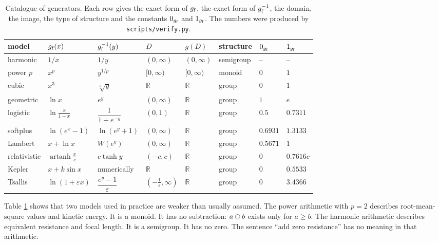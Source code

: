 \documentclass[11pt,a4paper]{article}
\begin{document}
\begin{table}[t]
\centering
\small
\caption{Catalogue of generators. Each row gives the exact form of $g_{\mathrm{f}}$, the
exact form of $g_{\mathrm{f}}^{-1}$, the domain, the image, the type of structure and the
constants $0_{g_{\mathrm{f}}}$ and $1_{g_{\mathrm{f}}}$. The numbers were produced by
\texttt{scripts/verify.py}.}
\label{tab:catalogue}
\setlength{\tabcolsep}{4pt}
\begin{tabularx}{\textwidth}{@{}l l l l l l l l@{}}
\toprule
\textbf{model} & $g_{\mathrm{f}}(x)$ & $g_{\mathrm{f}}^{-1}(y)$ & $D$ & $g(D)$ & \textbf{structure}
& $0_{g_{\mathrm{f}}}$ & $1_{g_{\mathrm{f}}}$ \\
\midrule
harmonic & $1/x$ & $1/y$ & $(0,\infty)$ & $(0,\infty)$ & semigroup & -- & -- \\
power $p$ & $x^{p}$ & $y^{1/p}$ & $[0,\infty)$ & $[0,\infty)$ & monoid & $0$ & $1$ \\
cubic & $x^{3}$ & $\sqrt[3]{y}$ & $\mathbb{R}$ & $\mathbb{R}$ & group & $0$ & $1$ \\
geometric & $\ln x$ & $e^{y}$ & $(0,\infty)$ & $\mathbb{R}$ & group & $1$ & $e$ \\
logistic & $\ln\frac{x}{1-x}$ & $\dfrac{1}{1+e^{-y}}$ & $(0,1)$ & $\mathbb{R}$ & group & $0.5$ & $0.7311$ \\
softplus & $\ln(e^{x}-1)$ & $\ln(e^{y}+1)$ & $(0,\infty)$ & $\mathbb{R}$ & group & $0.6931$ & $1.3133$ \\
Lambert & $x+\ln x$ & $W(e^{y})$ & $(0,\infty)$ & $\mathbb{R}$ & group & $0.5671$ & $1$ \\
relativistic & $\operatorname{artanh}\frac{x}{c}$ & $c\tanh y$
& $(-c,c)$ & $\mathbb{R}$ & group & $0$ & $0.7616c$ \\
Kepler & $x+k\sin x$ & numerically & $\mathbb{R}$ & $\mathbb{R}$ & group
& $0$ & $0.5533$ \\
Tsallis & $\ln(1+\varepsilon x)$ & $\dfrac{e^{y}-1}{\varepsilon}$
& $(-\tfrac1\varepsilon,\infty)$ & $\mathbb{R}$ & group & $0$ & $3.4366$ \\
\bottomrule
\end{tabularx}
\end{table}

Table \ref{tab:catalogue} shows that two models used in practice are weaker than
usually assumed. The power arithmetic with $p=2$ describes root-mean-square
values and kinetic energy. It is a monoid. It has no subtraction: $a\mathbin{\ominus} b$
exists only for $a\ge b$. The harmonic arithmetic describes equivalent
resistance and focal length. It is a semigroup. It has no zero. The sentence
``add zero resistance'' has no meaning in that arithmetic.
\end{document}
